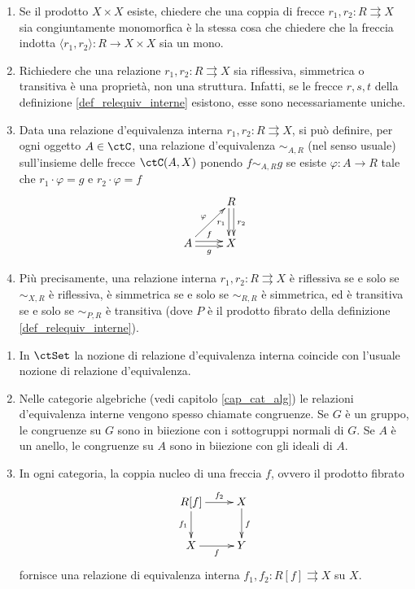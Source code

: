 \begin{remark}\label{rem_relequiv_interne} \hfill
 \begin{enumerate}
  \item Se il prodotto \(X \times X\) esiste, chiedere che una coppia di frecce \(r_1,r_2 \colon R \rightrightarrows X\)
        sia congiuntamente monomorfica è la stessa cosa che chiedere che la freccia indotta \(\langle r_1,r_2 \rangle \colon R \to X \times X\)
        sia un mono.
  \item Richiedere che una relazione \(r_1,r_2 \colon R \rightrightarrows X\) sia riflessiva, simmetrica o transitiva è
        una proprietà, non una struttura. Infatti, se le frecce \(r,s,t\) della definizione \ref{def_relequiv_interne} esistono, esse
        sono necessariamente uniche.
  \item Data una relazione d'equivalenza interna \(r_1,r_2 \colon R \rightrightarrows X\), si può definire, per ogni oggetto
        \(A \in \ctC\), una relazione d'equivalenza \(\sim_{A,R}\) (nel senso usuale) sull'insieme delle frecce \(\ctC(A,X)\) ponendo
        \(f \sim_{A,R} g\) se esiste \(\varphi \colon A \to R\) tale che \(r_1 \cdot \varphi = g\) e \(r_2 \cdot \varphi = f\)
        \[\xymatrix{ & R \ar@<-0.5ex>[d]_{r_1} \ar@<0.5ex>[d]^{r_2} \\
         A \ar[ru]^{\varphi} \ar@<0.5ex>[r]^-{f} \ar@<-0.5ex>[r]_-{g} & X}\]
  \item Più precisamente, una relazione interna \(r_1,r_2 \colon R \rightrightarrows X\) è riflessiva se e solo se \(\sim_{X,R}\)
        è riflessiva, è simmetrica se e solo se \(\sim_{R,R}\) è simmetrica, ed è transitiva se e solo se \(\sim_{P,R}\) è transitiva
        (dove \(P\) è il prodotto fibrato della definizione \ref{def_relequiv_interne}).
 \end{enumerate}
\end{remark}

\begin{examples}\label{ex_coppia_nucleo}
 \hfill
 \begin{enumerate}
  \item In \(\ctSet\) la nozione di relazione d'equivalenza interna coincide con l'usuale nozione di relazione d'equivalenza.
  \item Nelle categorie algebriche (vedi capitolo \ref{cap_cat_alg}) le relazioni d'equivalenza interne vengono spesso chiamate
        congruenze. Se \(G\) è un gruppo, le congruenze su \(G\) sono in biiezione con i sottogruppi normali di \(G\). Se \(A\)
        è un anello, le congruenze su \(A\) sono in biiezione con gli ideali di \(A\).
  \item In ogni categoria, la coppia nucleo di una freccia \(f\), ovvero il prodotto fibrato
        \[\xymatrix{R[f] \ar[d]_{f_1} \ar[r]^-{f_2} & X \ar[d]^{f} \\ X \ar[r]_-{f} & Y}\]
        fornisce una relazione di equivalenza interna \(f_1,f_2 \colon R[f] \rightrightarrows X\) su \(X\).
 \end{enumerate}
\end{examples}

